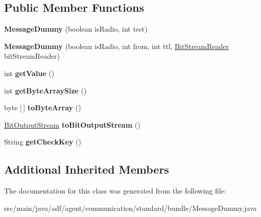 \subsection*{Public Member Functions}
\begin{DoxyCompactItemize}
\item 
\hypertarget{classadf_1_1agent_1_1communication_1_1standard_1_1bundle_1_1MessageDummy_ab3ceef3eb4b3311da20d4b4310eb0795}{}\label{classadf_1_1agent_1_1communication_1_1standard_1_1bundle_1_1MessageDummy_ab3ceef3eb4b3311da20d4b4310eb0795} 
{\bfseries Message\+Dummy} (boolean is\+Radio, int test)
\item 
\hypertarget{classadf_1_1agent_1_1communication_1_1standard_1_1bundle_1_1MessageDummy_afdcdaae1ecf091988bd49f9b99570193}{}\label{classadf_1_1agent_1_1communication_1_1standard_1_1bundle_1_1MessageDummy_afdcdaae1ecf091988bd49f9b99570193} 
{\bfseries Message\+Dummy} (boolean is\+Radio, int from, int ttl, \hyperlink{classadf_1_1component_1_1communication_1_1util_1_1BitStreamReader}{Bit\+Stream\+Reader} bit\+Stream\+Reader)
\item 
\hypertarget{classadf_1_1agent_1_1communication_1_1standard_1_1bundle_1_1MessageDummy_a3b3a83172ac728d572969e0f8112d1ce}{}\label{classadf_1_1agent_1_1communication_1_1standard_1_1bundle_1_1MessageDummy_a3b3a83172ac728d572969e0f8112d1ce} 
int {\bfseries get\+Value} ()
\item 
\hypertarget{classadf_1_1agent_1_1communication_1_1standard_1_1bundle_1_1MessageDummy_a935b8e5e053be0d5f00a31b3d8fd97c6}{}\label{classadf_1_1agent_1_1communication_1_1standard_1_1bundle_1_1MessageDummy_a935b8e5e053be0d5f00a31b3d8fd97c6} 
int {\bfseries get\+Byte\+Array\+Size} ()
\item 
\hypertarget{classadf_1_1agent_1_1communication_1_1standard_1_1bundle_1_1MessageDummy_a5c1cdb219eeabf93a2f8e6678c845006}{}\label{classadf_1_1agent_1_1communication_1_1standard_1_1bundle_1_1MessageDummy_a5c1cdb219eeabf93a2f8e6678c845006} 
byte \mbox{[}$\,$\mbox{]} {\bfseries to\+Byte\+Array} ()
\item 
\hypertarget{classadf_1_1agent_1_1communication_1_1standard_1_1bundle_1_1MessageDummy_ab7c82662d143afd6257de8ba12cda397}{}\label{classadf_1_1agent_1_1communication_1_1standard_1_1bundle_1_1MessageDummy_ab7c82662d143afd6257de8ba12cda397} 
\hyperlink{classadf_1_1component_1_1communication_1_1util_1_1BitOutputStream}{Bit\+Output\+Stream} {\bfseries to\+Bit\+Output\+Stream} ()
\item 
\hypertarget{classadf_1_1agent_1_1communication_1_1standard_1_1bundle_1_1MessageDummy_a5042873c24b04e8a064681133dffe2ca}{}\label{classadf_1_1agent_1_1communication_1_1standard_1_1bundle_1_1MessageDummy_a5042873c24b04e8a064681133dffe2ca} 
String {\bfseries get\+Check\+Key} ()
\end{DoxyCompactItemize}
\subsection*{Additional Inherited Members}


The documentation for this class was generated from the following file\+:\begin{DoxyCompactItemize}
\item 
src/main/java/adf/agent/communication/standard/bundle/Message\+Dummy.\+java\end{DoxyCompactItemize}
